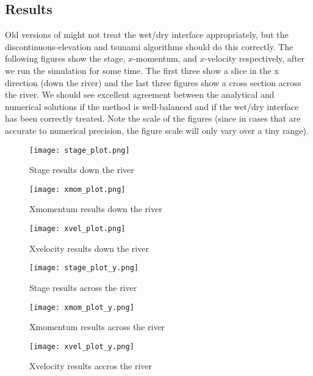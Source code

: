 \subsection{Results}


Old versions of \anuga{} might not treat the wet/dry interface appropriately,
but the discontinuous-elevation and tsunami algorithms should do this
correctly. The following figures show the stage, $x$-momentum, and $x$-velocity
respectively, after we run the simulation for some time. The first three show a
slice in the x direction (down the river) and the last three figures show a
cross section across the river. We should see excellent agreement between the
analytical and numerical solutions if the method is well-balanced and if the
wet/dry interface has been correctly treated. Note the scale of the figures
(since in cases that are accurate to numerical precision, the figure scale will
only vary over a tiny range).

\begin{figure}
\begin{center}
\texttt{[image: stage\_plot.png]}
\end{center}
\caption{Stage results down the river}
\end{figure}


\begin{figure}
\begin{center}
\texttt{[image: xmom\_plot.png]}
\end{center}
\caption{Xmomentum results down the river}
\end{figure}


\begin{figure}
\begin{center}
\texttt{[image: xvel\_plot.png]}
\end{center}
\caption{Xvelocity results down the river}
\end{figure}

\begin{figure}
\begin{center}
\texttt{[image: stage\_plot\_y.png]}
\end{center}
\caption{Stage results across the river}
\end{figure}


\begin{figure}
\begin{center}
\texttt{[image: xmom\_plot\_y.png]}
\end{center}
\caption{Xmomentum results across the river}
\end{figure}


\begin{figure}
\begin{center}
\texttt{[image: xvel\_plot\_y.png]}
\end{center}
\caption{Xvelocity results accros the river}
\end{figure}

\endinput
